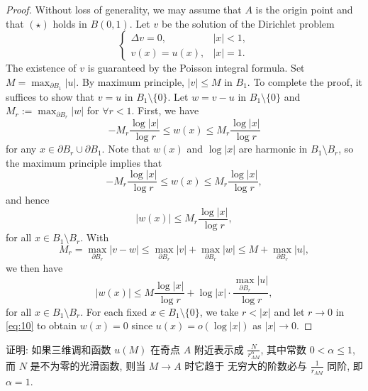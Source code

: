 \begin{proof}
  Without loss of generality, we may assume that $A$ is the origin point
  and that $(\star)$ holds in $B(0,1)$.
  Let $v$ be the solution of the Dirichlet problem
  \[\begin{cases}
    \Delta v = 0, & |x|<1, \\
    v(x) = u(x), &  |x|=1.
  \end{cases}\]
  The existence of $v$ is guaranteed by the Poisson integral formula.
  Set $M = \max_{\partial B_1} |u|$. By maximum principle, $|v|\leq M$ in $B_1$.
  To complete the proof, it suffices to show that $v = u$ in $B_1\setminus \{0\}$.
  Let $w = v-u$ in $B_1\setminus \{0\}$ and $M_r:=\max_{\partial B_r} |w|$ for
  $\forall r<1$. First, we have
  \begin{equation}\label{eq:7}
    - M_r \frac{\log |x|}{\log r} \leq w(x) \leq M_r \frac{\log |x|}{\log r}
  \end{equation}
  for any $x\in \partial B_r\cup\partial B_1$.
  Note that $w(x)$ and $\log |x|$ are harmonic in $B_1\setminus B_r$,
  so the maximum principle implies that
  \[ - M_r \frac{\log |x|}{\log r} \leq w(x) \leq M_r \frac{\log |x|}{\log r}, \]
  and hence
  \begin{equation}\label{eq:8}
    |w(x)| \leq M_r \frac{\log |x|}{\log r},
  \end{equation}
  for all $x\in B_1\setminus B_r$. With
  \begin{equation}\label{eq:9}
    M_r = \max_{\partial B_r} |v-w| \leq \max_{\partial B_r} |v|
      + \max_{\partial B_r} |w|
      \leq M + \max_{\partial B_r} |u|,
  \end{equation}
  we then have
  \begin{equation}\label{eq:10}
    |w(x)| \leq M \frac{\log |x|}{\log r}
      + \log |x| \cdot \frac{\max_{\partial B_r} |u|}{\log r},
  \end{equation}
  for all $x\in B_1\setminus B_r$. For each fixed $x\in B_1\setminus \{0\}$,
  we take $r<|x|$ and let $r\to 0$ in \eqref{eq:10}
  to obtain $w(x) = 0$ since $u(x) = o(\log |x|)$ as $|x|\to 0$.
\end{proof}


\begin{exercise}
  证明: 如果三维调和函数 $u(M)$ 在奇点 $A$ 附近表示成 $\frac{N}{r_{AM}^{\alpha}}$,
  其中常数 $0<\alpha\leq 1$, 而 $N$ 是不为零的光滑函数, 则当 $M\to A$ 时它趋于
  无穷大的阶数必与 $\frac{1}{r_{AM}}$ 同阶, 即 $\alpha=1$.
\end{exercise}

